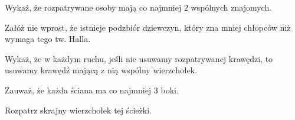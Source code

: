 
\begin{hints_list}
	\item Wykaż, że rozpatrywane osoby mają co najmniej $2$ wspólnych znajomych.
	\item Załóż nie wprost, że istnieje podzbiór dziewczyn, który zna mniej chłopców niż wymaga tego tw. Halla.
	\item Wykaż, że w każdym ruchu, jeśli nie usuwamy rozpatrywanej krawędzi, to usuwamy krawędź mającą z nią wspólny wierzchołek.
	\item Zauważ, że każda ściana ma co najmniej $3$ boki.
	\item Rozpatrz skrajny wierzchołek tej ścieżki.
	\item 
\end{hints_list}